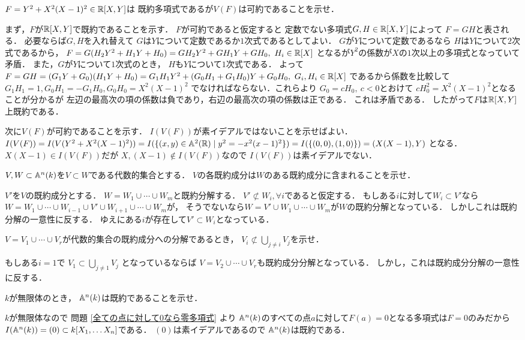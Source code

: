 \begin{prob}
  $F = Y^2 + X^2(X-1)^2 \in \mathbb{R}[X,Y] $は
  既約多項式であるが$V(F)$は可約であることを示せ．
\end{prob}
\begin{ans}
  まず，$F$が$\mathbb{R}[X,Y]$で既約であることを示す．
  $F$が可約であると仮定すると
  定数でない多項式$G,H \in \mathbb{R}[X,Y]$によって
  $F = GH$と表される．
  必要ならば$G,H$を入れ替えて
  $G$は$Y$について定数であるか$1$次式であるとしてよい．
  $G$が$Y$について定数であるなら
  $H$は$Y$について$2$次式であるから，
  $F = G(H_2Y^2 + H_1Y + H_0) = GH_2Y^2 + GH_1Y + GH_0 ,\ H_i \in \mathbb{R}[X] $
  となるが$Y^2$の係数が$X$の$1$次以上の多項式となっていて矛盾．
  また，$G$が$Y$について$1$次式のとき，
  $H$も$Y$について$1$次式である．
  よって
  $ F = GH = (G_1Y + G_0)(H_1Y + H_0)
  = G_1H_1 Y^2 + (G_0H_1 + G_1H_0) Y + G_0H_0, \ G_i, H_i \in \mathbb{R}[X] $
  であるから係数を比較して
  $G_1 H_1 = 1, G_0 H_1 = -G_1 H_0, G_0H_0 = X^2(X-1)^2 $
  でなければならない．これらより
  $ G_0 = c H_0 , \ c < 0$とおけて
  $c H_0^2 = X^2(X-1)^2 $となることが分かるが
  左辺の最高次の項の係数は負であり，右辺の最高次の項の係数は正である．
  これは矛盾である．
  したがって$F$は$\mathbb{R}[X,Y]$上既約である．
  
  次に$V(F)$が可約であることを示す．
  $I(V(F))$が素イデアルではないことを示せばよい．
  $I(V(F)) = I(V(Y^2 + X^2(X-1)^2))
  = I( \{ (x,y)\in\mathbb{A}^2(\mathbb{R}) \mid y^2 = -x^2(x-1)^2 \} )
  = I( \{ (0,0), (1,0) \} )
  = (X(X-1), Y) $
  となる．
  $X(X-1) \in I(V(F))$だが
  $X,(X-1) \not\in I(V(F)) $なので
  $I(V(F))$は素イデアルでない．
\end{ans}

\begin{prob}
  $V,W\subset \mathbb{A}^n(k)$を$V\subset W$である代数的集合とする．
  $V$の各既約成分は$W$のある既約成分に含まれることを示せ．
\end{prob}
\begin{ans}
  $V'$を$V$の既約成分とする．
  $W = W_1 \cup \cdots \cup W_m $と既約分解する．
  $V' \not \subset W_i, \forall i$であると仮定する．
  もしある$i$に対して$W_i \subset V'$なら
  $W = W_1 \cup \cdots \cup W_{i-1} \cup V' \cup W_{i+1} \cup \cdots \cup W_m $が，
  そうでないなら$W = V' \cup W_1 \cup \cdots \cup W_m $が$W$の既約分解となっている．
  しかしこれは既約分解の一意性に反する．
  ゆえにある$i$が存在して$V' \subset W_i $となっている．
\end{ans}

\begin{prob}
  $V = V_1 \cup \cdots \cup V_r $が代数的集合の既約成分への分解であるとき，
  $ V_i \not \subset \bigcup_{j\ne i} V_j$を示せ．
\end{prob}
\begin{ans}
  もしある$i=1$で
  $ V_1 \subset \bigcup_{j\ne 1} V_j$
  となっているならば
  $ V = V_2 \cup \cdots \cup V_r $も既約成分分解となっている．
  しかし，これは既約成分分解の一意性に反する．
\end{ans}

\begin{prob}
  $k$が無限体のとき，
  $\mathbb{A}^n(k)$は既約であることを示せ．
\end{prob}
\begin{ans}
  $k$が無限体なので
  問題 \ref{全ての点に対して0なら零多項式} より
  $\mathbb{A}^n(k)$のすべての点$a$に対して$F(a) = 0$となる多項式は$ F = 0 $のみだから
  $I( \mathbb{A}^n(k) ) = ( 0 ) \subset k[X_1,\dots X_n]$である．
  $(0)$は素イデアルであるので
  $\mathbb{A}^n(k)$は既約である．
\end{ans}
